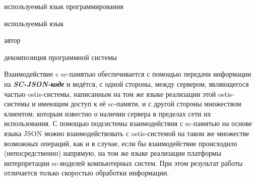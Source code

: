 \begin{scnitemize}
\begin{SCn}
\begin{scnrelfromlist}{используемый язык программирования}
\end{scnrelfromlist}
\begin{scnrelfromlist}{используемый язык}
\end{scnrelfromlist}
\begin{scnrelfromlist}{автор}
\end{scnrelfromlist}
\begin{scnrelfromset}{декомпозиция программной системы}
    \scnnonamednode
    \begin{scneqtoset}
    \end{scneqtoset}
\end{scnrelfromset}
\end{SCn}

Взаимодействие c sc-памятью обеспечивается с помощью передачи информации на \textit{\textbf{SC-JSON-коде}} и ведётся,
с одной стороны, между сервером, являющегося частью ostis-системы, написанным на том же языке реализации этой ostis-
системы и имеющим доступ к её sc-памяти, и с другой стороны множеством клиентом, которым известно о наличии сервера
в пределах сети их использования. С помощью подсистемы взаимодействия с sc-памятью на основе языка JSON можно
взаимодействовать с ostis-системой на таком же множестве возможных операций, как и в случае, если бы взаимодействие
происходило (непосредственно) напрямую, на том же языке реализации платформы интерпретации sc-моделей компьютерных
систем. При этом результат работы отличается только скоростью обработки информации.


\end{scnitemize}
